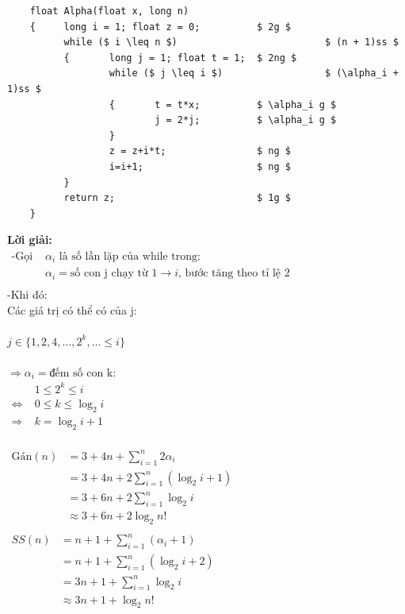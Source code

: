 \documentclass[12pt, letterpaper]{article}
\begin{document}
\begin{lstlisting}
    float Alpha(float x, long n)
    {     long i = 1; float z = 0;          $ 2g $
          while ($ i \leq n $)                          $ (n + 1)ss $
          {       long j = 1; float t = 1;  $ 2ng $
                  while ($ j \leq i $)                  $ (\alpha_i + 1)ss $
                  {       t = t*x;          $ \alpha_i g $
                          j = 2*j;          $ \alpha_i g $
                  }
                  z = z+i*t;                $ ng $
                  i=i+1;                    $ ng $
          }
          return z;                         $ 1g $
    }
\end{lstlisting}
\textbf{Lời giải: } \\
$ \begin{aligned}
		\text{-Gọi } & \alpha_i \text{ là số lần lặp của while trong:}                              \\
		            & \alpha_i = \text{số con j chạy từ 1} \rightarrow i \text{, bước tăng theo tỉ lệ 2} \\
	\end{aligned} $ \\
	-Khi đó:\\
	Các giá trị có thể có của j: \\ \\
	$ j \in \{ 1, 2, 4, \ldots, 2^k, \ldots \leq i \} $ \\ \\
	$ \Rightarrow \alpha_i = \text{đếm số con k:} $ \\ 
$ \begin{aligned}
    & 1 \leq 2^k \leq i \\
    \Leftrightarrow\; & 0 \leq k \leq \log_2{i} \\
    \Rightarrow\; & k = \log_2{i} + 1
\end{aligned} $ \\
 \\
$ \begin{aligned}
    \text{Gán}(n) & = 3 + 4n + \sum^{n}_{i = 1} 2 \alpha_i \\
                  & = 3 + 4n + 2 \sum^{n}_{i = 1} (\log_2{i} + 1) \\
                  & = 3 + 6n + 2 \sum^{n}_{i = 1} \log_2{i} \\
                  & \approx 3 + 6n + 2 \log_2n! \\
\end{aligned} $ \\
$ \begin{aligned}
	SS(n) & = n + 1 + \sum^{n}_{i = 1} (\alpha_i + 1)           \\
          & = n + 1 + \sum^{n}_{i = 1} (\log_2{i} + 2)           \\
          & = 3n + 1 + \sum^{n}_{i = 1} \log_2{i}           \\
          & \approx 3n + 1 + \log_2n!           \\
\end{aligned} $ \\
\end{document}

